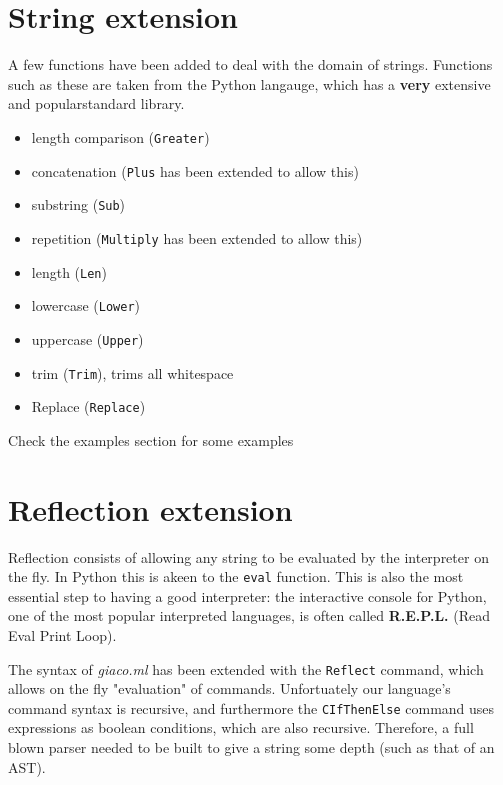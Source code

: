 \documentclass[11pt]{article}
\begin{document}
\section{String extension}
\label{sec:org82ae574}
A few functions have been added to deal with the domain of strings.
Functions such as these are taken from the Python langauge, which has a \textbf{very} extensive and popularstandard library.
\begin{itemize}
\item length comparison (\texttt{Greater})
\item concatenation (\texttt{Plus} has been extended to allow this)
\item substring (\texttt{Sub})
\item repetition (\texttt{Multiply} has been extended to allow this)
\item length (\texttt{Len})
\item lowercase (\texttt{Lower})
\item uppercase (\texttt{Upper})
\item trim (\texttt{Trim}), trims all whitespace
\item Replace (\texttt{Replace})
\end{itemize}

Check the examples section for some examples
\section{Reflection extension}
\label{sec:org3758799}
Reflection consists of allowing any string to be evaluated by the interpreter on the fly. In Python this is akeen to the \texttt{eval} function.
This is also the most essential step to having a good interpreter: the interactive console for Python,
 one of the most popular interpreted languages, is often called \textbf{R.E.P.L.} (Read Eval Print Loop).

The syntax of \emph{giaco.ml} has been extended with the \texttt{Reflect} command, which allows on the fly "evaluation" of commands.
Unfortuately our language's command syntax is recursive, and furthermore the \texttt{CIfThenElse} command
uses expressions as boolean conditions, which are also recursive.
Therefore, a full blown parser needed to be built to give a string some depth (such as that of an AST).
\end{document}

